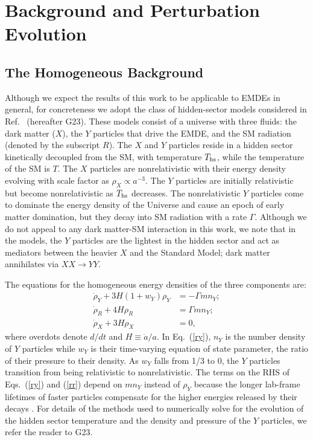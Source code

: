 \documentclass[a4paper,11pt]{article}
\newcommand{\ths}{T_{\rm hs}}
\begin{document}
\section{Background and Perturbation Evolution}
\label{background}

\subsection{The Homogeneous Background}

Although we expect the results of this work to be applicable to EMDEs in general, for concreteness we adopt the class of hidden-sector models considered in Ref.~\cite{hg23} (hereafter G23). These models consist of a universe with three fluids: the dark matter ($X$), the $Y$ particles that drive the EMDE, and the SM radiation (denoted by the subscript $R$). The $X$ and $Y$ particles reside in a hidden sector kinetically decoupled from the SM, with temperature $\ths$, while the temperature of the SM is $T$. The $X$ particles are nonrelativistic with their energy density evolving with scale factor as $\rho_X \propto a^{-3}$. The $Y$ particles are initially relativistic but become nonrelativistic as $\ths$ decreases. The nonrelativistic $Y$ particles come to dominate the energy density of the Universe and cause an epoch of early matter domination, but they decay into SM radiation with a rate $\Gamma$. Although we do not appeal to any dark matter-SM interaction in this work, we note that in the models, the $Y$ particles are the lightest in the hidden sector and act as mediators between the heavier $X$ and the Standard Model; dark matter annihilates via $XX \rightarrow YY$.

The equations for the homogeneous energy densities of the three components are: \begin{subequations} \label{eqback}
\begin{align}
    \dot{\rho}_Y + 3H(1 + w_Y)\rho_Y &= - \Gamma mn_Y; \label{ry} \\ 
    \dot{\rho}_R + 4H\rho_R &=  \Gamma mn_Y; \label{rr} \\ 
    \dot{\rho}_X + 3H\rho_X &= 0, \label{rx}
    \end{align}
\end{subequations} where overdots denote $d/dt$ and $H \equiv \dot{a}/a$. In Eq.~(\ref{ry}), $n_Y$ is the number density of $Y$ particles while $w_Y$ is their time-varying equation of state parameter, the ratio of their pressure to their density. As $w_Y$ falls from 1/3 to 0, the $Y$ particles transition from being relativistic to nonrelativistic. The terms on the RHS of Eqs.~(\ref{ry}) and (\ref{rr}) depend on $mn_Y$ instead of $\rho_Y$ because the longer lab-frame lifetimes of faster particles compensate for the higher energies released by their decays \cite{cannibal_big}. For details of the methods used to numerically solve for the evolution of the hidden sector temperature and the density and pressure of the $Y$ particles, we refer the reader to G23.
\end{document}
